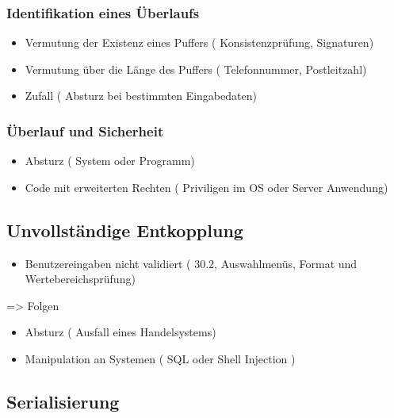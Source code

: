 \subsubsection*{Identifikation eines Überlaufs}
\begin{itemize}
	\item Vermutung der Existenz eines Puffers ( Konsistenzprüfung, Signaturen)
	\item Vermutung über die Länge des Puffers ( Telefonnummer, Postleitzahl)
	\item Zufall ( Absturz bei bestimmten Eingabedaten)
\end{itemize}

\subsubsection*{Überlauf und Sicherheit }
\begin{itemize}
	\item Absturz ( System oder Programm)
	\item Code mit erweiterten Rechten ( Priviligen im OS oder Server Anwendung)
\end{itemize}

\subsection*{Unvollständige Entkopplung}
\begin{itemize}
	\item Benutzereingaben nicht validiert ( 30.2, Auswahlmenüs, Format und Wertebereichsprüfung)
\end{itemize}
	=> Folgen
	\begin{itemize}
		\item Absturz ( Ausfall eines Handelsystems)
		\item Manipulation an Systemen ( SQL oder Shell Injection )
	\end{itemize}

\subsection*{ Serialisierung}
